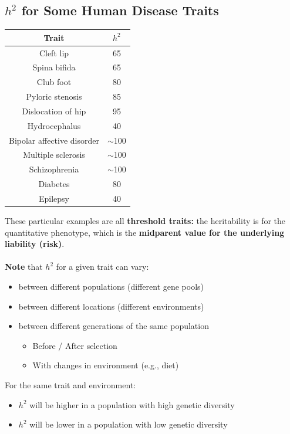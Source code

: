 \documentclass[10pt]{article}
\begin{document}
\subsection*{$h^2$ for Some Human Disease Traits}
\begin{center}
    \begin{tabular}{|c|c|}
        \hline
        \textbf{Trait} & $h^2$ \\ \hline
        Cleft lip & 65 \\
        Spina bifida & 65 \\
        Club foot & 80 \\
        Pyloric stenosis & 85 \\
        Dislocation of hip & 95 \\
        Hydrocephalus & 40 \\
        Bipolar affective disorder & $\sim$100 \\
        Multiple sclerosis & $\sim$100 \\
        Schizophrenia & $\sim$100 \\
        Diabetes & 80 \\
        Epilepsy & 40 \\ \hline
    \end{tabular}
\end{center}
These particular examples are all \textbf{threshold traits:} the heritability is for the quantitative phenotype, which is the \textbf{midparent value for the underlying liability (risk)}.\\\\
\textbf{Note} that $h^2$ for a given trait can vary:
\begin{itemize}
	\item between different populations (different gene pools)
	\item between different locations (different environments)
	\item between different generations of the same population
	\begin{itemize}
	    \item Before / After selection
	    \item With changes in environment (e.g., diet)
    \end{itemize}
\end{itemize}
For the same trait and environment:
\begin{itemize}
	\item $h^2$ will be higher in a population with high genetic diversity
	\item $h^2$ will be lower in a population with low genetic diversity
\end{itemize}
\end{document}
